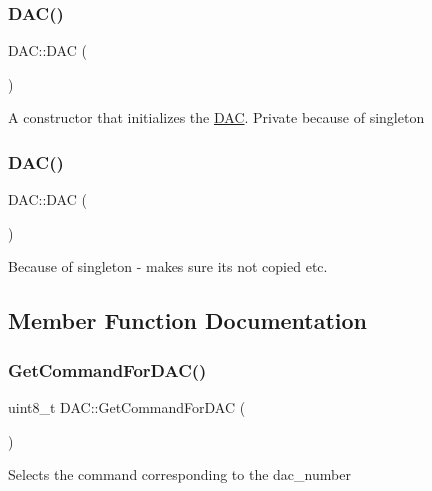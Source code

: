 \subsubsection{\texorpdfstring{D\+A\+C()}{DAC()}\hspace{0.1cm}{\footnotesize\ttfamily [1/2]}}
{\footnotesize\ttfamily D\+A\+C\+::\+D\+AC (\begin{DoxyParamCaption}{ }\end{DoxyParamCaption})\hspace{0.3cm}{\ttfamily [private]}}

A constructor that initializes the \hyperlink{class_d_a_c}{D\+AC}. Private because of singleton \hypertarget{class_d_a_c_af656669246f70c7ccbbd05d0e65088d4}{}\label{class_d_a_c_af656669246f70c7ccbbd05d0e65088d4} 
\subsubsection{\texorpdfstring{D\+A\+C()}{DAC()}\hspace{0.1cm}{\footnotesize\ttfamily [2/2]}}
{\footnotesize\ttfamily D\+A\+C\+::\+D\+AC (\begin{DoxyParamCaption}\item[{const \hyperlink{class_d_a_c}{D\+AC} \&}]{ }\end{DoxyParamCaption})\hspace{0.3cm}{\ttfamily [delete]}}

Because of singleton -\/ makes sure its not copied etc. 

\subsection{Member Function Documentation}
\hypertarget{class_d_a_c_a535a7552ff0b9a68af94893a9c17dbed}{}\label{class_d_a_c_a535a7552ff0b9a68af94893a9c17dbed} 
\subsubsection{\texorpdfstring{Get\+Command\+For\+D\+A\+C()}{GetCommandForDAC()}}
{\footnotesize\ttfamily uint8\+\_\+t D\+A\+C\+::\+Get\+Command\+For\+D\+AC (\begin{DoxyParamCaption}{ }\end{DoxyParamCaption})}

Selects the command corresponding to the dac\+\_\+number \hypertarget{class_d_a_c_a6584c17f9f941589a78e806c10386789}{}\label{class_d_a_c_a6584c17f9f941589a78e806c10386789} 
